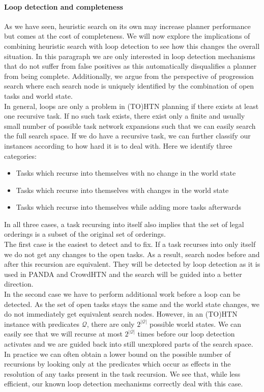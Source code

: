 \paragraph{Loop detection and completeness}
\label{improv: loops and completeness}
As we have seen, heuristic search on its own may increase planner performance but comes at the cost of completeness. We will now explore the implications of combining heuristic search with loop detection to see how this changes the overall situation. In this paragraph we are only interested in loop detection mechanisms that do not suffer from false positives as this automatically disqualifies a planner from being complete. Additionally, we argue from the perspective of progression search where each search node is uniquely identified by the combination of open tasks and world state.\\
In general, loops are only a problem in (TO)HTN planning if there exists at least one recursive task. If no such task exists, there exist only a finite and usually small number of possible task network expansions such that we can easily search the full search space. If we do have a recursive task, we can further classify our instances according to how hard it is to deal with. Here we identify three categories:
\begin{itemize}
	\item Tasks which recurse into themselves with no change in the world state
	\item Tasks which recurse into themselves with changes in the world state
	\item Tasks which recurse into themselves while adding more tasks afterwards
\end{itemize}
In all three cases, a task recursing into itself also implies that the set of legal orderings is a subset of the original set of orderings. \\
The first case is the easiest to detect and to fix. If a task recurses into only itself we do not get any changes to the open tasks. As a result, search nodes before and after this recursion are equivalent. They will be detected by loop detection as it is used in PANDA and CrowdHTN and the search will be guided into a better direction. \\
In the second case we have to perform additional work before a loop can be detected. As the set of open tasks stays the same and the world state changes, we do not immediately get equivalent search nodes. However, in an (TO)HTN instance with predicates $\mathcal{Q}$, there are only $2^{|\mathcal{Q}|}$ possible world states. We can easily see that we will recurse at most $2^{|\mathcal{Q}|}$ times before our loop detection activates and we are guided back into still unexplored parts of the search space. In practice we can often obtain a lower bound on the possible number of recursions by looking only at the predicates which occur as effects in the resolution of any tasks present in the task recursion. We see that, while less efficient, our known loop detection mechanisms correctly deal with this case. \\

